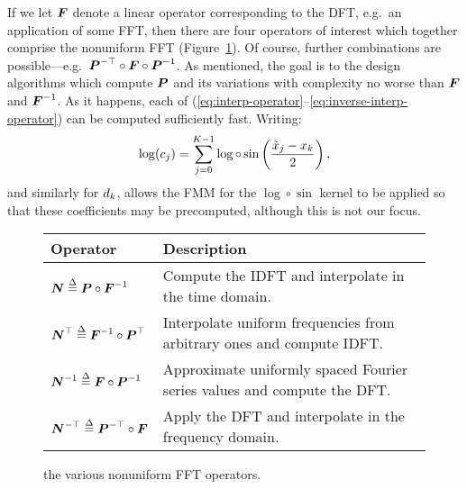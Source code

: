 If we let $\boldsymbol{F}$ denote a linear operator corresponding to the DFT,
e.g.\ an application of some FFT, then there are four operators of
interest which together comprise the nonuniform FFT
(Figure~\ref{fig:operators}).  Of course, further combinations are
possible---e.g.\ $\boldsymbol{P}^{-\top}\circ\boldsymbol{F}\circ\boldsymbol{P}^{-1}$. As
mentioned, the goal is to the design algorithms which compute
$\boldsymbol{P}$ and its variations with complexity no worse than $\boldsymbol{F}$
and $\boldsymbol{F}^{-1}$. As it happens, each of
(\ref{eq:interp-operator}--\ref{eq:inverse-interp-operator}) can be
computed sufficiently fast. Writing:
\begin{align}
  \label{eq:log-sin}
  \log(c_{j}) = \sum_{{j{}}=0}^{K{}-1} \log\circ\sin\left(\frac{{\tilde{x}}_{j}-{x}_{k}}{2}\right),
\end{align}
and similarly for $d_{k}$, allows the FMM for the
$\log\circ\sin$ kernel to be applied so that these coefficients may be
precomputed, although this is not our focus.

\begin{figure}[h]
  \centering
  \begin{tabular}[h]{ll}
    Operator & Description \\
    \midrule
    $\boldsymbol{N} \overset{\Delta}{=} \boldsymbol{P}\circ\boldsymbol{F}^{-1}$ & Compute the IDFT and interpolate in the time domain. \\
    $\boldsymbol{N}^\top \overset{\Delta}{=} \boldsymbol{F}^{-1}\circ\boldsymbol{P}^\top$ & Interpolate uniform frequencies from arbitrary ones and compute IDFT.\@ \\
    $\boldsymbol{N}^{-1} \overset{\Delta}{=} \boldsymbol{F}\circ\boldsymbol{P}^{-1}$ & Approximate uniformly spaced Fourier series values and compute the DFT.\@ \\
    $\boldsymbol{N}^{-\top} \overset{\Delta}{=} \boldsymbol{P}^{-\top}\circ\boldsymbol{F}$ & Apply the DFT and interpolate in the frequency domain. \\
  \end{tabular}
  \caption{the various nonuniform FFT operators.}\label{fig:operators}
\end{figure}

